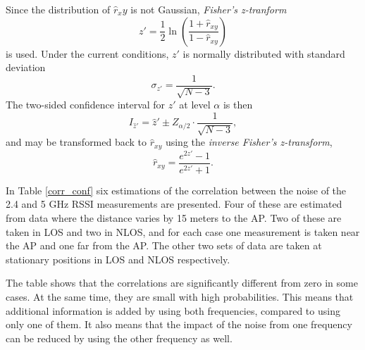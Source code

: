 \documentclass{LTHthesis}
\begin{document}
Since the distribution of $\hat r_xy$ is not Gaussian, \emph{Fisher's z-tranform}
%
\begin{equation}
z'=\frac{1}{2}\ln{\left(\frac{1+\hat r_{xy}}{1-\hat r_{xy}}\right)}
\end{equation}
%
is used. Under the current conditions, $ z'$ is normally distributed with standard deviation
%
\begin{equation}
\sigma_{z'}=\frac{1}{\sqrt{N-3}}.
\end{equation} 
%
The two-sided confidence interval for $z'$ at level $\alpha$ is then
%
\begin{equation}
I_{\hat z'} = \hat z' \pm Z_{\alpha/2}\cdot\frac{1}{\sqrt{N-3}}, 
\end{equation}
%
and may be transformed back to $\hat  r_{xy}$ using the \emph{inverse Fisher's z-transform},
%
\begin{equation}
\hat r_{xy}=\frac{e^{2z'}-1}{e^{2z'}+1}.
\end{equation}

In Table \ref{corr_conf} six estimations of the correlation between the noise of the 2.4 and 5 GHz RSSI measurements are presented. Four of these are estimated from data where the distance varies by 15 meters to the AP. Two of these are taken in LOS and two in NLOS, and for each case one measurement is taken near the AP and one far from the AP. The other two sets of data are taken at stationary positions in LOS and NLOS respectively.

The table shows that the correlations are significantly different from zero in some cases. At the same time, they are small with high probabilities. This means that additional information is added by using both frequencies, compared to using only one of them. It also means that the impact of the noise from one frequency can be reduced by using the other frequency as well.
\end{document}
